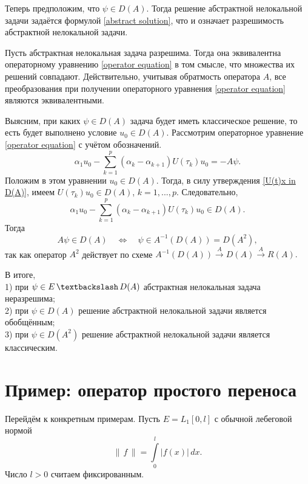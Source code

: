 \documentclass{article}
\theoremstyle{definition}
\begin{document}
Теперь предположим, что $\psi \in D(A)$. Тогда решение абстрактной нелокальной задачи задаётся формулой \eqref{abstract solution}, 
что и означает разрешимость абстрактной нелокальной задачи.

Пусть абстрактная нелокальная задача разрешима. Тогда она эквивалентна операторному уравнению \eqref{operator equation} в том смысле, 
что множества их решений совпадают. Действительно, учитывая обратмость оператора $A$,
все преобразования при получении операторного уравнения \eqref{operator equation} являются
эквивалентными. 

Выясним, при каких $ \psi \in D(A) $ задача будет иметь классическое решение, то есть будет выполнено условие $ u_0 \in D(A) $.
Рассмотрим операторное уравнение \eqref{operator equation} с учётом обозначений.
\begin{equation*}
	\alpha_1 u_0 - \sum\limits_{k = 1}^{p} (\alpha_k - \alpha_{k + 1})U(\tau_k)u_0 = -A\psi.
\end{equation*}
Положим в этом уравнении $u_0 \in D(A)$. 
Тогда, в силу утверждения \ref{U(t)x in D(A)}, имеем \linebreak $U(\tau_k)u_0 \in D(A)$, $k = 1,..., p$. 
Следовательно, 
\begin{equation*}
	\alpha_1 u_0 - \sum\limits_{k = 1}^{p} (\alpha_k - \alpha_{k + 1})U(\tau_k)u_0 \in D(A).
\end{equation*}
Тогда
\begin{equation*}
	A\psi \in D(A) \quad \Longleftrightarrow \quad \psi \in A^{-1}(D(A)) = D(A^2),
\end{equation*}
так как оператор $A^2$ действует по схеме $ A^{-1}(D(A)) \xrightarrow{A} D(A) \xrightarrow{A} R(A). $

В итоге, \\
1) при $ \psi \in E \, \textbackslash \, D(A) $ абстрактная нелокальная задача неразрешима; \\
2) при $ \psi \in D(A) $ решение абстрактной нелокальной задачи является обобщённым; \\
3) при $ \psi \in D(A^2) $ решение абстрактной нелокальной задачи является классическим.

\newpage

\section{Пример: оператор простого переноса}
Перейдём к конкретным примерам. Пусть $E = L_1[0,l]$ с обычной лебеговой нормой
\begin{equation} \label{norm}
	\|\, f \,\| = \int\limits_0^l | f(x) | \,dx.
\end{equation}
Число $l > 0$ считаем фиксированным.
\end{document}
